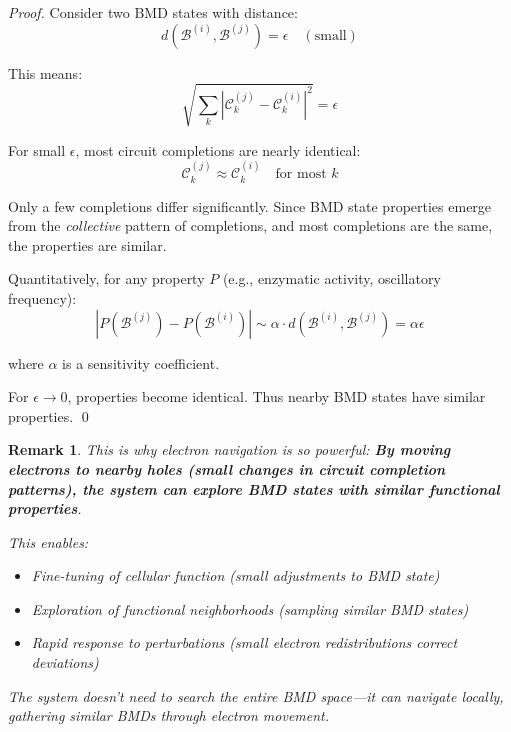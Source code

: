 \documentclass[12pt,a4paper]{article}
\newtheorem{remark}{Remark}
\begin{document}
\begin{proof}
Consider two BMD states with distance:
\begin{equation}
d(\mathcal{B}^{(i)}, \mathcal{B}^{(j)}) = \epsilon \quad (\text{small})
\end{equation}

This means:
\begin{equation}
\sqrt{\sum_k |\mathcal{C}_k^{(j)} - \mathcal{C}_k^{(i)}|^2} = \epsilon
\end{equation}

For small $\epsilon$, most circuit completions are nearly identical:
\begin{equation}
\mathcal{C}_k^{(j)} \approx \mathcal{C}_k^{(i)} \quad \text{for most } k
\end{equation}

Only a few completions differ significantly. Since BMD state properties emerge from the \textit{collective} pattern of completions, and most completions are the same, the properties are similar.

Quantitatively, for any property $P$ (e.g., enzymatic activity, oscillatory frequency):
\begin{equation}
|P(\mathcal{B}^{(j)}) - P(\mathcal{B}^{(i)})| \sim \alpha \cdot d(\mathcal{B}^{(i)}, \mathcal{B}^{(j)}) = \alpha \epsilon
\end{equation}

where $\alpha$ is a sensitivity coefficient.

For $\epsilon \to 0$, properties become identical. Thus nearby BMD states have similar properties. \qed
\end{proof}

\begin{remark}
This is why electron navigation is so powerful: \textbf{By moving electrons to nearby holes (small changes in circuit completion patterns), the system can explore BMD states with similar functional properties}.

This enables:
\begin{itemize}
\item Fine-tuning of cellular function (small adjustments to BMD state)
\item Exploration of functional neighborhoods (sampling similar BMD states)
\item Rapid response to perturbations (small electron redistributions correct deviations)
\end{itemize}

The system doesn't need to search the entire BMD space—it can navigate locally, gathering similar BMDs through electron movement.
\end{remark}
\end{document}
